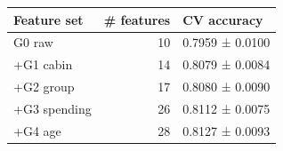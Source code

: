\begin{tabular}{lrl}
\toprule
Feature set & # features & CV accuracy \\
\midrule
G0 raw & 10 & 0.7959 ± 0.0100 \\
+G1 cabin & 14 & 0.8079 ± 0.0084 \\
+G2 group & 17 & 0.8080 ± 0.0090 \\
+G3 spending & 26 & 0.8112 ± 0.0075 \\
+G4 age & 28 & 0.8127 ± 0.0093 \\
\bottomrule
\end{tabular}
